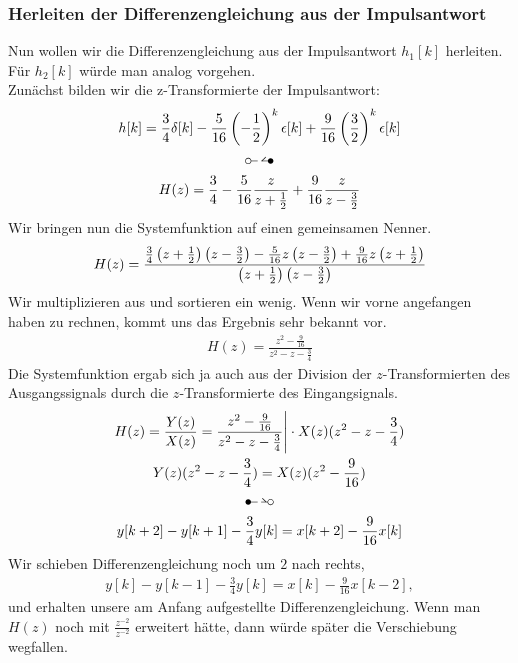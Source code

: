 \documentclass[11pt,a4paper,DIV=12]{scrartcl}
\begin{document}
\subsubsection*{Herleiten der Differenzengleichung aus der Impulsantwort}
%
Nun wollen wir die Differenzengleichung aus der Impulsantwort $h_1[k]$
herleiten.
%
Für $h_2[k]$ würde man analog vorgehen.\\
%
Zunächst bilden wir die z-Transformierte der Impulsantwort:
%
\begin{gather}
	h[k]=\frac{3}{4}\delta[k]-\frac{5}{16}\left(-\frac{1}{2}\right)^k\epsilon[k]+\frac{9}{16}\left(\frac{3}{2}\right)^k\epsilon[k]\\
	\ztransf\nonumber\\
	H(z)=\frac{3}{4}-\frac{5}{16}\frac{z}{z+\frac{1}{2}}+\frac{9}{16}\frac{z}{z-\frac{3}{2}}
\end{gather}
%
Wir bringen nun die Systemfunktion auf einen gemeinsamen Nenner.
%
\begin{align}
	H(z)=
	\frac{
		\frac{3}{4}\left(z+\frac{1}{2}\right)\left(z-\frac{3}{2}\right)-\frac{5}{16}z\left(z-\frac{3}{2}\right)+\frac{9}{16}z\left(z+\frac{1}{2}\right)
	}
	{
		\left(z+\frac{1}{2}\right)\left(z-\frac{3}{2}\right)
	}
\end{align}
%
Wir multiplizieren aus und sortieren ein wenig. Wenn wir vorne angefangen haben
zu rechnen, kommt uns das Ergebnis sehr bekannt vor.
%
\begin{gather}
	H(z)=\frac{z^2-\frac{9}{16}}{z^2-z-\frac{3}{4}}
\end{gather}
%
Die Systemfunktion ergab sich ja auch aus der Division der $z$-Transformierten
des Ausgangssignals durch die $z$-Transformierte des Eingangsignals.
%
\begin{gather}
	H(z)=\frac{Y(z)}{X(z)}=\frac{z^2-\frac{9}{16}}{z^2-z-\frac{3}{4}}\Bigg |\cdot X(z)(z^2-z-\frac{3}{4})\\
	Y(z)(z^2-z-\frac{3}{4})=X(z)(z^2-\frac{9}{16})\\
	\Ztransf\nonumber \\
	y[k+2]-y[k+1]-\frac{3}{4}y[k]=x[k+2]-\frac{9}{16}x[k]
\end{gather}
%
Wir schieben Differenzengleichung noch um $2$ nach rechts,
%
\begin{align}
	y[k]-y[k-1]-\frac{3}{4}y[k]=x[k]-\frac{9}{16}x[k-2],
\end{align}
%
und erhalten unsere am Anfang aufgestellte Differenzengleichung.
%
Wenn man $H(z)$ noch mit $\frac{z^{-2}}{z^{-2}}$ erweitert hätte,
dann würde später die Verschiebung wegfallen.
%
\newpage
\end{document}

